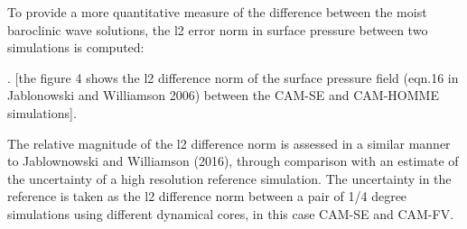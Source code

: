 {\color{red}{Show results for wave evolution and L2 error norms}}
To provide a more quantitative measure of the difference between the moist baroclinic wave solutions, the l2 error norm in surface pressure between two simulations is computed:

. [the figure 4 shows the l2 difference norm of the surface pressure field (eqn.16 in Jablonowski and Williamson 2006) between the CAM-SE and CAM-HOMME simulations]. 

The relative magnitude of the l2 difference norm is assessed in a similar manner to Jablownowski and Williamson (2016), through comparison with an estimate of the uncertainty of a high resolution reference simulation. The uncertainty in the reference is taken as the l2 difference norm between a pair of 1/4 degree simulations using different dynamical cores, in this case CAM-SE and CAM-FV.
